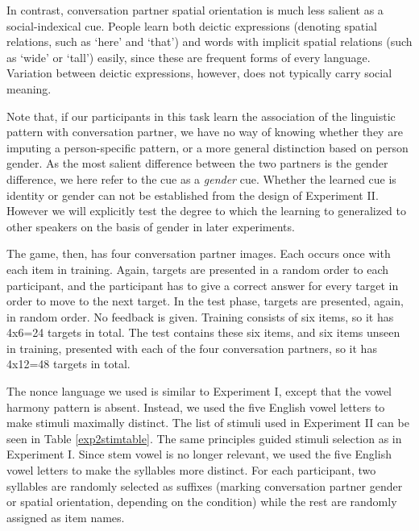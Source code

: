 \documentclass{frontiersSCNS} %
\begin{document}
In contrast, conversation partner spatial orientation is much less salient as a social-indexical cue. People learn both deictic expressions (denoting spatial relations, such as `here' and `that') and words with implicit spatial relations (such as `wide' or `tall') easily, since these are frequent forms of every language. Variation between deictic expressions, however, does not typically carry social meaning.

 Note that, if our participants in this task learn the association of the linguistic pattern with conversation partner, we have no way of knowing whether they are imputing a person-specific pattern, or a more general distinction based on person gender.  As the most salient difference between the two partners is the gender difference, we here refer to the cue as a \emph{gender} cue.  Whether the learned cue is identity or gender can not be established from the design of Experiment II.   However we will explicitly test the degree to which the learning to generalized to other speakers on the basis of gender in later experiments.

 
 
The game, then, has four conversation partner images. Each occurs once with each item in training. Again, targets are presented in a random order to each participant, and the participant has to give a correct answer for every target in order to move to the next target. In the test phase, targets are presented, again, in random order. No feedback is given. Training consists of six items, so it has 4x6=24 targets in total. The test contains these six items, and six items unseen in training, presented with each of the four conversation partners, so it has 4x12=48 targets in total. 

The nonce language we used is similar to Experiment I, except that the vowel harmony pattern is absent. Instead, we used the five English vowel letters to make stimuli maximally distinct. The list of stimuli used in Experiment II can be seen in Table \ref{exp2stimtable}. The same principles guided stimuli selection as in Experiment I. Since stem vowel is no longer relevant, we used the five English vowel letters to make the syllables more distinct. For each participant, two syllables are randomly selected as suffixes (marking conversation partner gender or spatial orientation, depending on the condition) while the rest are randomly assigned as item names.
\end{document}
